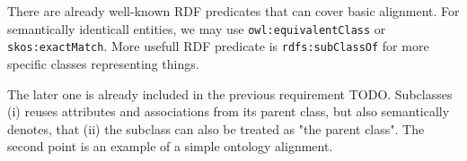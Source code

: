 There are already well-known RDF predicates that can cover basic alignment. For semantically identicall entities, we may use \verb|owl:equivalentClass| or \verb|skos:exactMatch|. More usefull RDF predicate is \verb|rdfs:subClassOf| for more specific classes representing things.

The later one is already included in the previous requirement TODO. Subclasses (i) reuses attributes and associations from its parent class, but also semantically denotes, that (ii) the subclass can also be treated as "the parent class". The second point is an example of a simple ontology alignment.

\begin{showcase}
\end{showcase}
